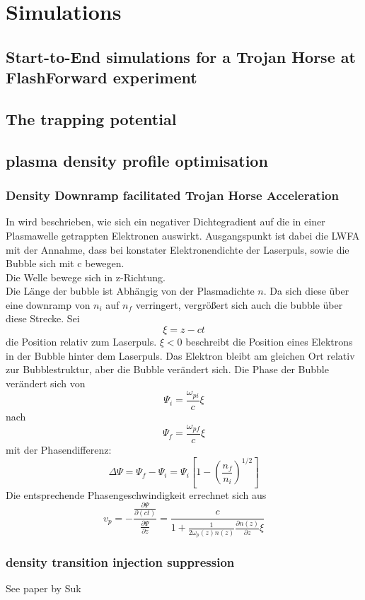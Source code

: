 \chapter{Simulations}
\section{Start-to-End simulations for a Trojan Horse at FlashForward experiment}
\section{The trapping potential}
\section{plasma density profile optimisation}
\subsection{Density Downramp facilitated Trojan Horse Acceleration}

In %
 wird beschrieben, wie sich ein negativer Dichtegradient auf die in einer Plasmawelle getrappten Elektronen auswirkt.
Ausgangspunkt ist dabei die LWFA mit der Annahme, dass bei konstater Elektronendichte der Laserpuls, sowie die Bubble sich mit c bewegen.\\
Die Welle bewege sich in z-Richtung.\\
Die L\"ange der bubble ist Abh\"angig von der Plasmadichte $n$. Da sich diese \"uber eine downramp von $n_i$ auf $n_f$ verringert, vergr\"o\ss ert sich auch die bubble \"uber diese Strecke.
Sei $$\xi=z-ct$$ die Position relativ zum Laserpuls. $\xi<0$ beschreibt die Position eines Elektrons in der Bubble hinter dem Laserpuls.
Das Elektron bleibt am gleichen Ort relativ zur Bubblestruktur, aber die Bubble ver\"andert sich. Die Phase der Bubble ver\"andert sich von 
$$\Psi_i=\frac{\omega_{pi}}{c}\xi$$ nach
$$\Psi_f=\frac{\omega_{pf}}{c}\xi$$
mit der Phasendifferenz:
$$\Delta\Psi=\Psi_f-\Psi_i=\Psi_i[1-(\frac{n_f}{n_i})^{1/2}]$$
Die entsprechende Phasengeschwindigkeit errechnet sich aus 
$$v_p=-\frac{\frac{\partial \Psi}{\partial(ct)}}{\frac{\partial \Psi}{\partial z}}=\frac{c}{1+\frac{1}{2\omega_p(z)n(z)}\frac{\partial n(z)}{\partial z}\xi }$$
\subsection{density transition injection suppression}
See paper by Suk

